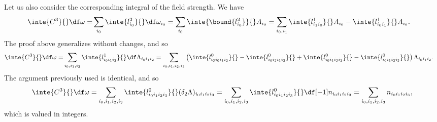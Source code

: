 Let us also consider the corresponding integral of the field strength. We have
\begin{align*}
	\inte{C^{3}}{}\df\omega =& \sum\limits_{i_{0}}\inte{l_{i_{0}}^{2}}{}\df\omega_{i_{0}} = \sum\limits_{i_{0}}\inte{\bound{l_{i_{0}}^{2}}}{}A_{i_{0}} = \sum\limits_{i_{0}, i_{1}}\inte{l_{i_{1}i_{0}}^{1}}{}A_{i_{0}} - \inte{l_{i_{0}i_{1}}^{1}}{}A_{i_{0}}.
\end{align*}
The proof above generalizes without changes, and so
\begin{align*}
	\inte{C^{3}}{}\df\omega =& \sum\limits_{i_{0}, i_{1}, i_{2}}\inte{l_{i_{0}i_{1}i_{2}}^{1}}{}\df\Lambda_{i_{0}i_{1}i_{2}} = \sum\limits_{i_{0}, i_{1}, i_{2}, i_{3}}\left(\inte{l_{i_{3}i_{0}i_{1}i_{2}}^{0}}{} - \inte{l_{i_{0}i_{3}i_{1}i_{2}}^{0}}{} + \inte{l_{i_{0}i_{1}i_{3}i_{2}}^{0}}{} - \inte{l_{i_{0}i_{1}i_{2}i_{3}}^{0}}{}\right)\Lambda_{i_{0}i_{1}i_{2}}.
\end{align*}
The argument previously used is identical, and so
\begin{align*}
	\inte{C^{3}}{}\df\omega = \sum\limits_{i_{0}, i_{1}, i_{2}, i_{3}}\inte{l_{i_{0}i_{1}i_{2}i_{3}}^{0}}{}(\delta_{2}\Lambda)_{i_{0}i_{1}i_{2}i_{3}} = \sum\limits_{i_{0}, i_{1}, i_{2}, i_{3}}\inte{l_{i_{0}i_{1}i_{2}i_{3}}^{0}}{}\df[-1]n_{i_{0}i_{1}i_{2}i_{3}} = \sum\limits_{i_{0}, i_{1}, i_{2}, i_{3}}n_{i_{0}i_{1}i_{2}i_{3}},
\end{align*}
which is valued in integers.